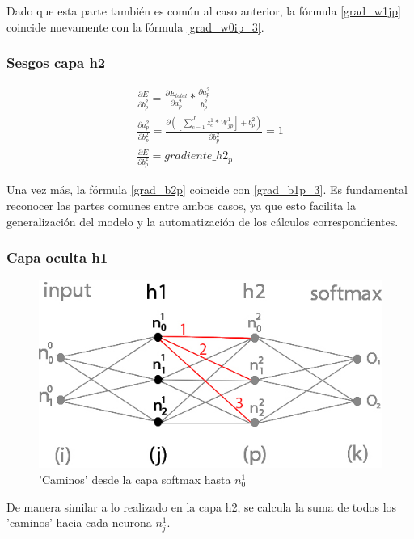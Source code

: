 Dado que esta parte también es común al caso anterior, la fórmula \ref{grad_w1jp} coincide nuevamente con la fórmula \ref{grad_w0ip_3}.


\subsubsection{Sesgos capa h2}

\begin{gather}
	\frac{\partial E}{\partial b^2_p} = \frac{\partial E_{total} }{\partial a^2_p } * \frac{\partial a^2_p}{b^2_p} \\
	\frac{\partial a^2_p }{\partial b^2_p } = \frac{\partial ([\sum_{c=1}^{J} z^1_c * W^1_{jp}] + b^2_p) }{\partial b^2_p } = 1 \\
	\frac{\partial E}{\partial b^2_p} = gradiente\_h2_p
	\label{grad_b2p}
\end{gather}

Una vez más, la fórmula \ref{grad_b2p} coincide con \ref{grad_b1p_3}. Es fundamental reconocer las partes comunes entre ambos casos, ya que esto facilita la generalización del modelo y la automatización de los cálculos correspondientes.

\subsubsection{Capa oculta h1}

\begin{figure}[H]
	\centering
	\includegraphics[scale=0.35]{imagenes/nn_h1_caminos_posibles.jpg}  
	\caption{'Caminos' desde la capa softmax hasta $n^1_0$}
	\label{nn_h1_caminos_posibles}
\end{figure}

De manera similar a lo realizado en la capa h2, se calcula la suma de todos los 'caminos' hacia cada neurona $n^1_j$. \\

